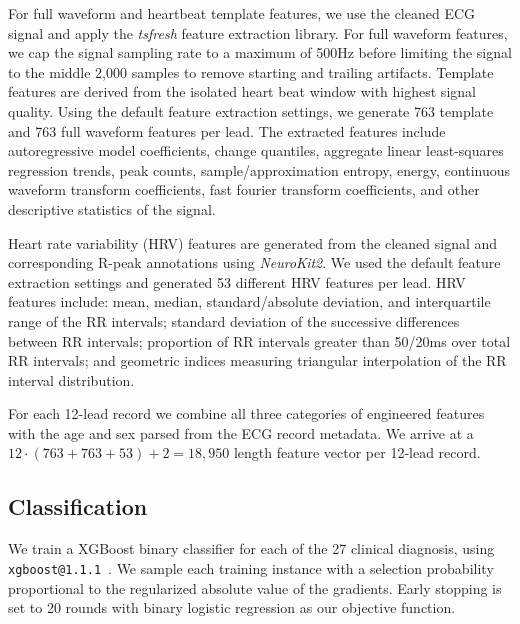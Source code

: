 \documentclass[twocolumn]{cinc}
\begin{document}
For full waveform and heartbeat template features, we use the cleaned ECG signal and apply the \emph{tsfresh} feature extraction library.
For full waveform features, we cap the signal sampling rate to a maximum of 500Hz before limiting the signal to the middle 2,000 samples to remove starting and trailing artifacts.
Template features are derived from the isolated heart beat window with highest signal quality.
Using the default feature extraction settings, we generate 763 template and 763 full waveform features per lead.
The extracted features include autoregressive model coefficients, change quantiles, aggregate linear least-squares regression trends, peak counts, sample/approximation entropy, energy, continuous waveform transform coefficients, fast fourier transform coefficients, and other descriptive statistics of the signal.

Heart rate variability (HRV) features are generated from the cleaned signal and corresponding R-peak annotations using \emph{NeuroKit2}.
We used the default feature extraction settings and generated 53 different HRV features per lead.
HRV features include: mean, median, standard/absolute deviation, and interquartile range of the RR intervals; standard deviation of the successive differences between RR intervals; proportion of RR intervals greater than 50/20ms over total RR intervals; and geometric indices measuring triangular interpolation of the RR interval distribution.

For each 12-lead record we combine all three categories of engineered features with the age and sex parsed from the ECG record metadata.
We arrive at a $12 \cdot (763 + 763 + 53) + 2 = 18,950$ length feature vector per 12-lead record.

\subsection{Classification}

We train a XGBoost binary classifier for each of the 27 clinical diagnosis, using \texttt{xgboost@1.1.1}~\cite{chen_xgboost_2016}.
We sample each training instance with a selection probability proportional to the regularized absolute value of the gradients.
Early stopping is set to 20 rounds with binary logistic regression as our objective function.
\end{document}
